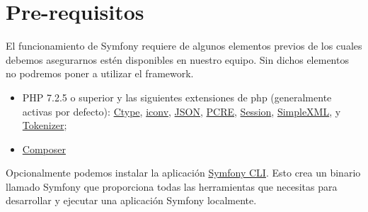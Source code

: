 \section{Pre-requisitos}
El funcionamiento de Symfony requiere de algunos elementos previos de los cuales debemos asegurarnos estén disponibles en nuestro equipo. Sin dichos elementos no podremos poner a utilizar el framework.

\begin{itemize}
    \item PHP 7.2.5 o superior y las siguientes extensiones de php (generalmente activas por defecto): \href{https://www.php.net/book.ctype}{Ctype}, \href{https://www.php.net/book.iconv}{iconv}, \href{https://www.php.net/book.json}{JSON}, \href{https://www.php.net/book.pcre}{PCRE}, \href{https://www.php.net/book.session}{Session}, \href{https://www.php.net/book.simplexml}{SimpleXML}, y \href{https://www.php.net/book.tokenizer}{Tokenizer}; 
    \item \href{https://getcomposer.org/download/}{Composer}
\end{itemize}

Opcionalmente podemos instalar la aplicación \href{https://symfony.com/download}{Symfony CLI}. 
Esto crea un binario llamado Symfony que proporciona todas las herramientas que necesitas para desarrollar y ejecutar una aplicación Symfony localmente.
